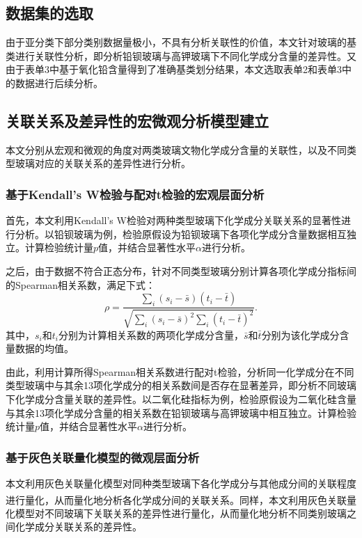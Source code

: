 \documentclass[withoutpreface,bwprint]{cumcmthesis} %
\begin{document}
\subsection{数据集的选取}

由于亚分类下部分类别数据量极小，不具有分析关联性的价值，本文针对玻璃的基类进行关联性分析，即分析铅钡玻璃与高钾玻璃下不同化学成分含量的差异性。又由于表单3中基于氧化铅含量得到了准确基类划分结果，本文选取表单2和表单3中的数据进行后续分析。

\subsection{关联关系及差异性的宏微观分析模型建立}

本文分别从宏观和微观的角度对两类玻璃文物化学成分含量的关联性，以及不同类型玻璃对应的关联关系的差异性进行分析。

\subsubsection{基于Kendall's W检验与配对t检验的宏观层面分析}

首先，本文利用Kendall's W检验对两种类型玻璃下化学成分关联关系的显著性进行分析。以铅钡玻璃为例，检验原假设为铅钡玻璃下各项化学成分含量数据相互独立。计算检验统计量$p$值，并结合显著性水平$\alpha$进行分析。

之后，由于数据不符合正态分布，针对不同类型玻璃分别计算各项化学成分指标间的Spearman相关系数，满足下式：
\begin{equation}
 \rho=\frac{\sum_{i}\left(s_{i}-\bar{s}\right)\left(t_{i}-\bar{t}\right)}{\sqrt{\sum_{i}\left(s_{i}-\bar{s}\right)^{2} \sum_{i}\left(t_{i}-\bar{t}\right)^{2}}} .
\end{equation}
其中，$s_i$和$t_i$分别为计算相关系数的两项化学成分含量，$\bar{s}$和$\bar{t}$分别为该化学成分含量数据的均值。

由此，利用计算所得Spearman相关系数进行配对t检验，分析同一化学成分在不同类型玻璃中与其余13项化学成分的相关系数间是否存在显著差异，即分析不同玻璃下化学成分含量关联的差异性。以二氧化硅指标为例，检验原假设为二氧化硅含量与其余13项化学成分含量的相关系数在铅钡玻璃与高钾玻璃中相互独立。计算检验统计量$p$值，并结合显著性水平$\alpha$进行分析。

\subsubsection{基于灰色关联量化模型的微观层面分析}

本文利用灰色关联量化模型对同种类型玻璃下各化学成分与其他成分间的关联程度进行量化，从而量化地分析各化学成分间的关联关系\textsuperscript{\cite{ref10}}。同样，本文利用灰色关联量化模型对不同玻璃下关联关系的差异性进行量化，从而量化地分析不同类别玻璃之间化学成分关联关系的差异性。
\end{document}
